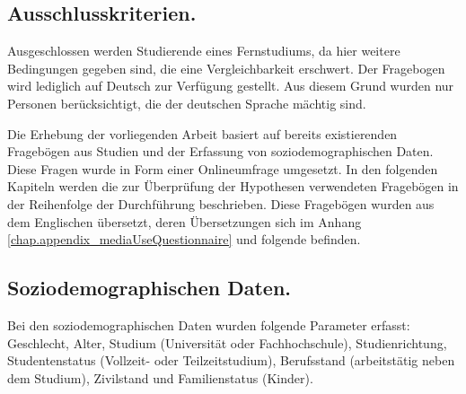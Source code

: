 \subsection{Ausschlusskriterien.}\label{subsection.ausschlusskriterien}
Ausgeschlossen werden Studierende eines Fernstudiums, da hier weitere Bedingungen gegeben sind, die eine Vergleichbarkeit erschwert. Der Fragebogen wird lediglich auf Deutsch zur Verfügung gestellt. Aus diesem Grund wurden nur Personen berücksichtigt, die der deutschen Sprache mächtig sind. 

\label{section.erhebungsinstrumente}
Die Erhebung der vorliegenden Arbeit basiert auf bereits existierenden Fragebögen aus Studien und der Erfassung von soziodemographischen Daten. Diese Fragen wurde in Form einer Onlineumfrage umgesetzt. In den folgenden Kapiteln werden die zur Überprüfung der Hypothesen verwendeten Fragebögen in der Reihenfolge der Durchführung beschrieben. Diese Fragebögen wurden aus dem Englischen übersetzt, deren Übersetzungen sich im Anhang \ref{chap.appendix_mediaUseQuestionnaire} und folgende befinden.

\subsection{Soziodemographischen Daten.}\label{subsection.soziDaten}
Bei den soziodemographischen Daten wurden folgende Parameter erfasst: Geschlecht, Alter, Studium (Universität oder Fachhochschule), Studienrichtung, Studentenstatus (Vollzeit- oder Teilzeitstudium), Berufsstand (arbeitstätig neben dem Studium), Zivilstand und Familienstatus (Kinder). \\

